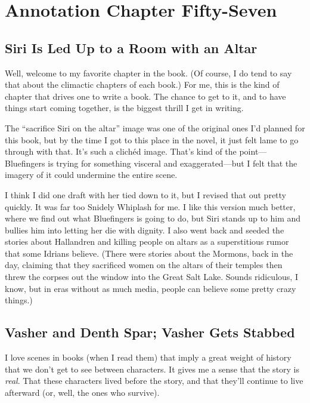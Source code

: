 \section{Annotation Chapter Fifty-Seven}

\subsection*{Siri Is Led Up to a Room with an Altar}

Well, welcome to my favorite chapter in the book. (Of course, I do tend to say that about the climactic chapters of each book.) For me, this is the kind of chapter that drives one to write a book. The chance to get to it, and to have things start coming together, is the biggest thrill I get in writing.

The “sacrifice Siri on the altar” image was one of the original ones I’d planned for this book, but by the time I got to this place in the novel, it just felt lame to go through with that. It’s such a clichéd image. That’s kind of the point—Bluefingers is trying for something visceral and exaggerated—but I felt that the imagery of it could undermine the entire scene.

I think I did one draft with her tied down to it, but I revised that out pretty quickly. It was far too Snidely Whiplash for me. I like this version much better, where we find out what Bluefingers is going to do, but Siri stands up to him and bullies him into letting her die with dignity. I also went back and seeded the stories about Hallandren and killing people on altars as a superstitious rumor that some Idrians believe. (There were stories about the Mormons, back in the day, claiming that they sacrificed women on the altars of their temples then threw the corpses out the window into the Great Salt Lake. Sounds ridiculous, I know, but in eras without as much media, people can believe some pretty crazy things.)

\subsection*{Vasher and Denth Spar; Vasher Gets Stabbed}

I love scenes in books (when I read them) that imply a great weight of history that we don’t get to see between characters. It gives me a sense that the story is \textit{real}. That these characters lived before the story, and that they’ll continue to live afterward (or, well, the ones who survive).


